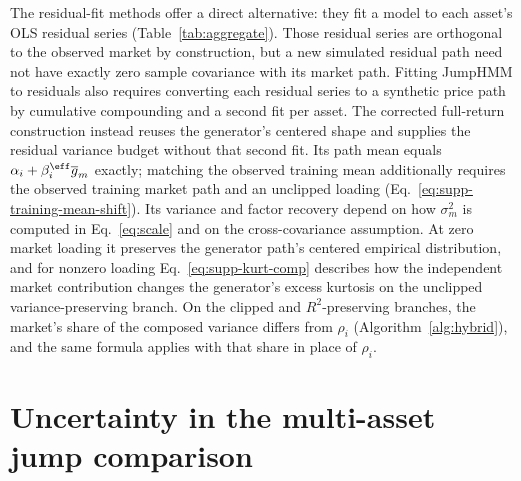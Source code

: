 The residual-fit methods offer a direct alternative: they fit a model
to each asset's OLS residual series (Table~\ref{tab:aggregate}). Those
residual series are orthogonal to the observed market by
construction, but a new simulated residual path need not have exactly
zero sample covariance with its market path. Fitting JumpHMM to
residuals also requires converting each residual series to a
synthetic price path by cumulative compounding and a second fit per
asset. The corrected full-return construction instead reuses the
generator's centered shape and supplies the residual variance budget
without that second fit. Its path mean equals
$\alpha_i+\beta_i^{\eff}\overline{g}_m$ exactly; matching the observed
training mean additionally requires the observed training market path
and an unclipped loading (Eq.~\eqref{eq:supp-training-mean-shift}).
Its variance and factor recovery depend on how $\sigma_m^2$ is
computed in Eq.~\eqref{eq:scale} and on the cross-covariance
assumption. At zero market loading it preserves the generator path's
centered empirical distribution, and for nonzero loading
Eq.~\eqref{eq:supp-kurt-comp} describes how the independent market
contribution changes the generator's excess kurtosis on the unclipped
variance-preserving branch. On the clipped and $R^2$-preserving
branches, the market's share of the composed variance differs from
$\rho_i$ (Algorithm~\ref{alg:hybrid}), and the same formula applies
with that share in place of $\rho_i$.

\begin{table}[H]
\centering
\caption{\textbf{Simulation check of the kurtosis composition rule.}
    For each variance share $\rho_i$, $200$ pairs of independent
    in-sample-length generator paths were standardized and combined
    as $\sqrt{\rho_i}\, x + \sqrt{1 - \rho_i}\, y$. The predicted
    column evaluates Eq.~\eqref{eq:supp-kurt-comp} with each pair's
    sample excess kurtosis; the simulated column is the sample excess
    kurtosis of the combined series. Both are averaged over the $200$
    pairs.}
\label{tab:supp-kurt-composition}
\small

\end{table}


\section{Uncertainty in the multi-asset jump comparison}
\label{sec:supp-jump-composition}

